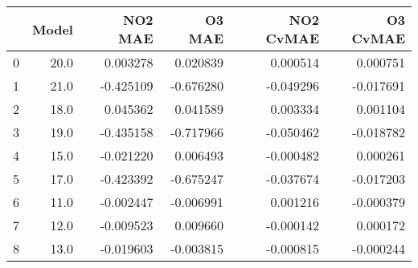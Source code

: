 \begin{tabular}{lrrrrr}
\toprule
{} &  Model &   NO2 MAE &    O3 MAE &  NO2 CvMAE &  O3 CvMAE \\
\midrule
0 &   20.0 &  0.003278 &  0.020839 &   0.000514 &  0.000751 \\
1 &   21.0 & -0.425109 & -0.676280 &  -0.049296 & -0.017691 \\
2 &   18.0 &  0.045362 &  0.041589 &   0.003334 &  0.001104 \\
3 &   19.0 & -0.435158 & -0.717966 &  -0.050462 & -0.018782 \\
4 &   15.0 & -0.021220 &  0.006493 &  -0.000482 &  0.000261 \\
5 &   17.0 & -0.423392 & -0.675247 &  -0.037674 & -0.017203 \\
6 &   11.0 & -0.002447 & -0.006991 &   0.001216 & -0.000379 \\
7 &   12.0 & -0.009523 &  0.009660 &  -0.000142 &  0.000172 \\
8 &   13.0 & -0.019603 & -0.003815 &  -0.000815 & -0.000244 \\
\bottomrule
\end{tabular}
